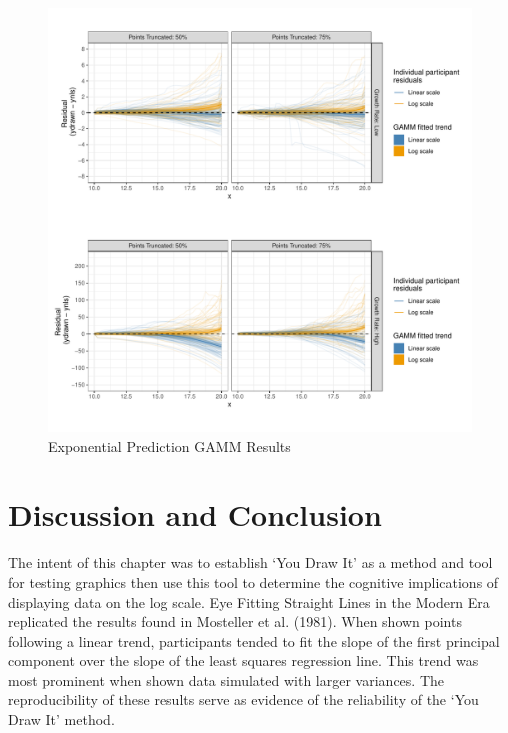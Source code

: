 \documentclass[print]{nuthesis}
\begin{document}
\begin{figure}[tbp]

{\centering \includegraphics[width=1\linewidth,]{thesis_files/figure-latex/exponential-prediction-gamm-preds-1} 

}

\caption{Exponential Prediction GAMM Results}\label{fig:exponential-prediction-gamm-preds}
\end{figure}

\hypertarget{discussion-and-conclusion-1}{%
\section{Discussion and Conclusion}\label{discussion-and-conclusion-1}}

The intent of this chapter was to establish `You Draw It' as a method and tool for testing graphics then use this tool to determine the cognitive implications of displaying data on the log scale.
Eye Fitting Straight Lines in the Modern Era replicated the results found in Mosteller et al. (1981).
When shown points following a linear trend, participants tended to fit the slope of the first principal component over the slope of the least squares regression line.
This trend was most prominent when shown data simulated with larger variances.
The reproducibility of these results serve as evidence of the reliability of the `You Draw It' method.
\end{document}
